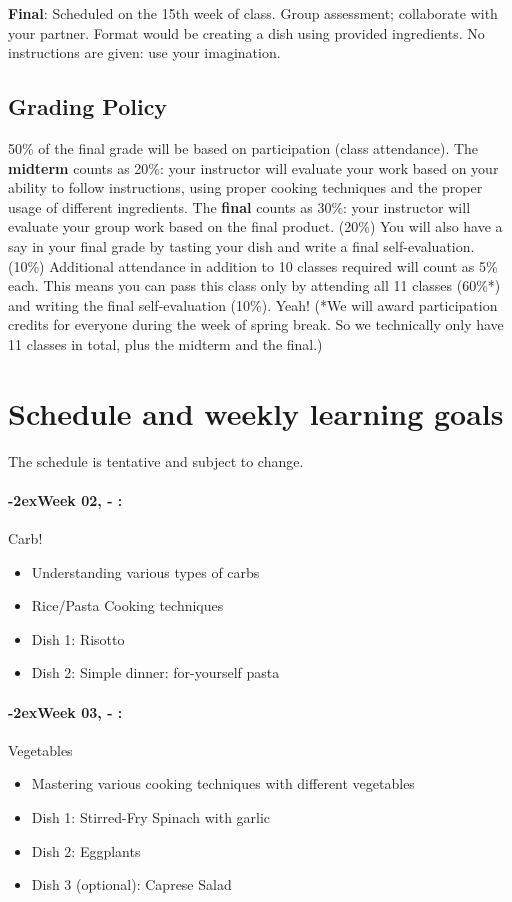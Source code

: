 \documentclass[11pt]{article}
\newcommand{\week}[1]{%
  \paragraph*{\kern-2ex\quad #1, \syldate{\today} - \AdvanceDate[4]\syldate{\today}:}%
  \ifdim\wd1=\wd\MONDAY
    \AdvanceDate[7]
  \else
    \AdvanceDate[7]
  \fi%
}
\begin{document}
\bigskip

\noindent \textbf{Final}: Scheduled on the 15th week of class. Group assessment; collaborate with your partner. Format would be creating a dish using provided ingredients. No instructions are given: use your imagination.

\subsection*{Grading Policy}

50\% of the final grade will be based on participation (class attendance). The \textbf{midterm} counts as 20\%: your instructor will evaluate your work based on your ability to follow instructions, using proper cooking techniques and the proper usage of different ingredients. The \textbf{final} counts as 30\%: your instructor will evaluate your group work based on the final product. (20\%) You will also have a say in your final grade by tasting your dish and write a final self-evaluation. (10\%)
Additional attendance in addition to 10 classes required will count as 5\% each. This means you can pass this class only by attending all 11 classes (60\%*) and writing the final self-evaluation (10\%). Yeah! (*We will  award participation credits for everyone during the week of spring break. So we technically only have 11 classes in total, plus the midterm and the final.)


\section*{Schedule and weekly learning goals}

The schedule is tentative and subject to change. 

\SetDate[22/01/2019]
\week{Week 02} Carb!
\begin{itemize}
\item Understanding various types of carbs
\item Rice/Pasta Cooking techniques
\item Dish 1: Risotto
\item Dish 2: Simple dinner: for-yourself pasta 
\end{itemize}

\week{Week 03} Vegetables
\begin{itemize}
\item Mastering various cooking techniques with different vegetables
\item Dish 1: Stirred-Fry Spinach with garlic 
\item Dish 2: Eggplants 
\item Dish 3 (optional): Caprese Salad
\end{itemize}
\end{document}
